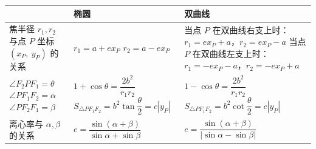 \documentclass{article}
\begin{document}
\begin{table}[htbp]
  \centering
  \renewcommand{\arraystretch}{2.2} %
  \begin{tabular}{|m{4cm}<{\centering}|m{5cm}<{\centering}|m{5cm}<{\centering}|}
    \hline
     & \textbf{椭圆} & \textbf{双曲线} \\
    \hline
    \makecell{焦半径 $r_1,r_2$\\与点 $P$ 坐标\\$(x_P,\ y_P)$ 的关系} 
    & \makecell{$r_1 = a + e x_P$\\$r_2 = a - e x_P$} 
    & \makecell{当点 $P$ 在双曲线右支上时：\\$r_1 = e x_P + a$，$r_2 = e x_P - a$\\当点 $P$ 在双曲线左支上时：\\$r_1 = -e x_P - a$，$r_2 = -e x_P + a$} \\
    \hline
    \makecell{$\angle F_2PF_1 = \theta$\\$\angle PF_1F_2 = \alpha$\\$\angle PF_2F_1 = \beta$} 
    & \makecell{$1 + \cos\theta = \dfrac{2b^2}{r_1r_2}$\\$S_{\triangle PF_1F_2} = b^2\tan\dfrac{\theta}{2} = c|y_P|$} 
    & \makecell{$1 - \cos\theta = \dfrac{2b^2}{r_1r_2}$\\$S_{\triangle PF_1F_2} = b^2\cot\dfrac{\theta}{2} = c|y_P|$} \\
    \hline
    \makecell{离心率与 $\alpha,\beta$\\的关系} 
    & $e = \dfrac{\sin(\alpha+\beta)}{\sin\alpha + \sin\beta}$ 
    & $e = \dfrac{\sin(\alpha+\beta)}{\left|\sin\alpha - \sin\beta\right|}$ \\
    \hline
  \end{tabular}
\end{table}
\newpage
\end{document}
